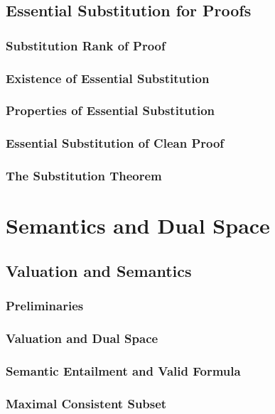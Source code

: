 \documentclass{report}
\begin{document}
\section{Essential Substitution for Proofs}
    \subsection{Substitution Rank of Proof}
      
    \subsection{Existence of Essential Substitution}
      
    \subsection{Properties of Essential Substitution}
      
    \subsection{Essential Substitution of Clean Proof}
      
    \subsection{The Substitution Theorem}
      
\chapter{Semantics and Dual Space}
\section{Valuation and Semantics}
    \subsection{Preliminaries}
      
    \subsection{Valuation and Dual Space}
      
    \subsection{Semantic Entailment and Valid Formula}
      
    \subsection{Maximal Consistent Subset}
      
\end{document}
